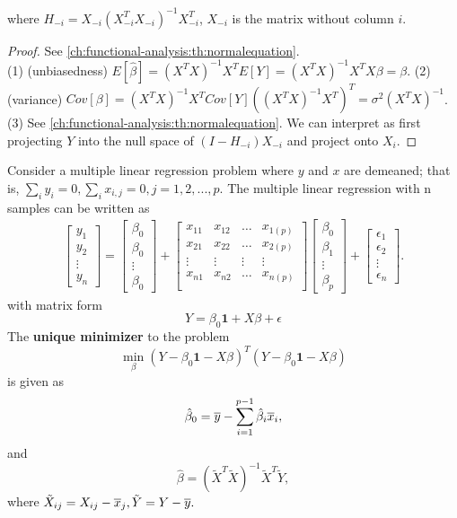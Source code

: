 \begin{refsection}
\begin{theorem}
\begin{itemize}
		where $H_{-i} = X_{-i}(X_{-i}^TX_{-i})^{-1} X_{-i}^T$, $X_{-i}$ is the matrix without column $i$.
	\end{itemize}
\end{theorem}
\begin{proof}
	See \autoref{ch:functional-analysis:th:normalequation}.\\
	(1) (unbiasedness) $E[\hat{\beta}] = (X^TX)^{-1}X^T E[Y] = (X^TX)^{-1}X^TX\beta = \beta.$
	(2) (variance) $Cov[\beta] = (X^TX)^{-1}X^TCov[Y]((X^TX)^{-1}X^T)^T = \sigma^2(X^TX)^{-1}$.
	(3) See \autoref{ch:functional-analysis:th:normalequation}. We can interpret as first projecting $Y$ into the null space of $(I-H_{-i})X_{-i}$ and project onto $X_i$. 
\end{proof}

\begin{theorem}\label{ch:statistical-models:th:leastSquareSolutionDemeanCase}
Consider a multiple linear regression problem where $y$ and $x$ are demeaned; that is, $\sum_i y_i = 0, \sum_{i}x_{i,j} = 0, j=1,2,...,p$. 	The multiple linear regression with n samples can be written as
\begin{align*}
\begin{bmatrix}
y_1\\
y_2\\
\vdots\\
y_n
\end{bmatrix} = \begin{bmatrix}
\beta_0\\
\beta_0\\
\vdots\\
\beta_0
\end{bmatrix}+\begin{bmatrix}
x_{11} & x_{12} & \dots & x_{1(p)}\\
x_{21} & x_{22} & \dots & x_{2(p)}\\
\vdots & \vdots & \vdots & \vdots \\
x_{n1} & x_{n2} & \dots & x_{n(p)}\\
\end{bmatrix}
\begin{bmatrix}
\beta_0\\
\beta_1\\
\vdots\\
\beta_{p}
\end{bmatrix}
+ \begin{bmatrix}
\epsilon_1\\
\epsilon_2\\
\vdots\\
\epsilon_{n}
\end{bmatrix}.
\end{align*}
	with matrix form
	$$Y = \beta_0\bm{1} + X\beta + \epsilon$$
	The \textbf{unique minimizer} to the problem 
	$$\min_\beta (Y-\beta_0\bm{1} -X\beta)^T(Y - \beta_0\bm{1} - X\beta)$$
	is given as
	$$\hat{\beta}_0 = \overline{y} - \sum_{i=1}^{p-1} \hat{\beta}_i \overline{x}_i,$$
	and
	$$\hat{\beta} = (\tilde{X}^T\tilde{X})^{-1}\tilde{X}^T\tilde{Y},$$
	where $\tilde{X}_{ij} = X_{ij} - \overline{x}_j, \tilde{Y} = Y - \overline{y}.$
	

\end{theorem}
\end{refsection}
